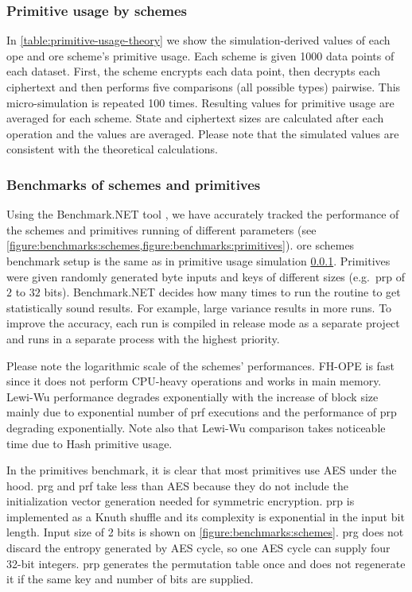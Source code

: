 		\subsubsection{Primitive usage by schemes}\label{section:range-snapshot:schemes-primitive-usage}

			In \cref{table:primitive-usage-theory} we show the simulation-derived values of each \acrshort{ope} and \acrshort{ore} scheme's primitive usage.
			Each scheme is given 1000 data points of each dataset.
			First, the scheme encrypts each data point, then decrypts each ciphertext and then performs five comparisons (all possible types) pairwise.
			This micro-simulation is repeated 100 times.
			Resulting values for primitive usage are averaged for each scheme.
			State and ciphertext sizes are calculated after each operation and the values are averaged.
			Please note that the simulated values are consistent with the theoretical calculations.

		\subsubsection{Benchmarks of schemes and primitives}

			Using the Benchmark.NET tool \cite{benchmark-net}, we have accurately tracked the performance of the schemes and primitives running of different parameters (see \cref{figure:benchmarks:schemes,figure:benchmarks:primitives}).
			\acrshort{ore} schemes benchmark setup is the same as in primitive usage simulation \cref{section:range-snapshot:schemes-primitive-usage}.
			Primitives were given randomly generated byte inputs and keys of different sizes (e.g.\ \acrshort{prp} of $2$ to $32$ bits).
			Benchmark.NET decides how many times to run the routine to get statistically sound results.
			For example, large variance results in more runs.
			To improve the accuracy, each run is compiled in release mode as a separate project and runs in a separate process with the highest priority.

			Please note the logarithmic scale of the schemes' performances.
			FH-OPE is fast since it does not perform CPU-heavy operations and works in main memory.
			Lewi-Wu performance degrades exponentially with the increase of block size mainly due to exponential number of \acrshort{prf} executions and the performance of \acrshort{prp} degrading exponentially.
			Note also that Lewi-Wu comparison takes noticeable time due to Hash primitive usage.

			In the primitives benchmark, it is clear that most primitives use AES under the hood.
			\acrshort{prg} and \acrshort{prf} take less than AES because they do not include the initialization vector generation needed for symmetric encryption.
			\acrshort{prp} is implemented as a Knuth shuffle \cite{knuth-shuffle} and its complexity is exponential in the input bit length.
			Input size of 2 bits is shown on \cref{figure:benchmarks:schemes}.
			\acrshort{prg} does not discard the entropy generated by AES cycle, so one AES cycle can supply four 32-bit integers.
			\acrshort{prp} generates the permutation table once and does not regenerate it if the same key and number of bits are supplied.

